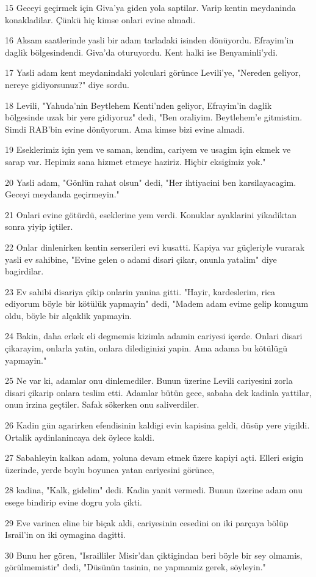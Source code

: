 \par 15 Geceyi geçirmek için Giva'ya giden yola saptilar. Varip kentin meydaninda konakladilar. Çünkü hiç kimse onlari evine almadi.
\par 16 Aksam saatlerinde yasli bir adam tarladaki isinden dönüyordu. Efrayim'in daglik bölgesindendi. Giva'da oturuyordu. Kent halki ise Benyaminli'ydi.
\par 17 Yasli adam kent meydanindaki yolculari görünce Levili'ye, "Nereden geliyor, nereye gidiyorsunuz?" diye sordu.
\par 18 Levili, "Yahuda'nin Beytlehem Kenti'nden geliyor, Efrayim'in daglik bölgesinde uzak bir yere gidiyoruz" dedi, "Ben oraliyim. Beytlehem'e gitmistim. Simdi RAB'bin evine dönüyorum. Ama kimse bizi evine almadi.
\par 19 Eseklerimiz için yem ve saman, kendim, cariyem ve usagim için ekmek ve sarap var. Hepimiz sana hizmet etmeye haziriz. Hiçbir eksigimiz yok."
\par 20 Yasli adam, "Gönlün rahat olsun" dedi, "Her ihtiyacini ben karsilayacagim. Geceyi meydanda geçirmeyin."
\par 21 Onlari evine götürdü, eseklerine yem verdi. Konuklar ayaklarini yikadiktan sonra yiyip içtiler.
\par 22 Onlar dinlenirken kentin serserileri evi kusatti. Kapiya var güçleriyle vurarak yasli ev sahibine, "Evine gelen o adami disari çikar, onunla yatalim" diye bagirdilar.
\par 23 Ev sahibi disariya çikip onlarin yanina gitti. "Hayir, kardeslerim, rica ediyorum böyle bir kötülük yapmayin" dedi, "Madem adam evime gelip konugum oldu, böyle bir alçaklik yapmayin.
\par 24 Bakin, daha erkek eli degmemis kizimla adamin cariyesi içerde. Onlari disari çikarayim, onlarla yatin, onlara dilediginizi yapin. Ama adama bu kötülügü yapmayin."
\par 25 Ne var ki, adamlar onu dinlemediler. Bunun üzerine Levili cariyesini zorla disari çikarip onlara teslim etti. Adamlar bütün gece, sabaha dek kadinla yattilar, onun irzina geçtiler. Safak sökerken onu saliverdiler.
\par 26 Kadin gün agarirken efendisinin kaldigi evin kapisina geldi, düsüp yere yigildi. Ortalik aydinlanincaya dek öylece kaldi.
\par 27 Sabahleyin kalkan adam, yoluna devam etmek üzere kapiyi açti. Elleri esigin üzerinde, yerde boylu boyunca yatan cariyesini görünce,
\par 28 kadina, "Kalk, gidelim" dedi. Kadin yanit vermedi. Bunun üzerine adam onu esege bindirip evine dogru yola çikti.
\par 29 Eve varinca eline bir biçak aldi, cariyesinin cesedini on iki parçaya bölüp Israil'in on iki oymagina dagitti.
\par 30 Bunu her gören, "Israilliler Misir'dan çiktigindan beri böyle bir sey olmamis, görülmemistir" dedi, "Düsünün tasinin, ne yapmamiz gerek, söyleyin."

